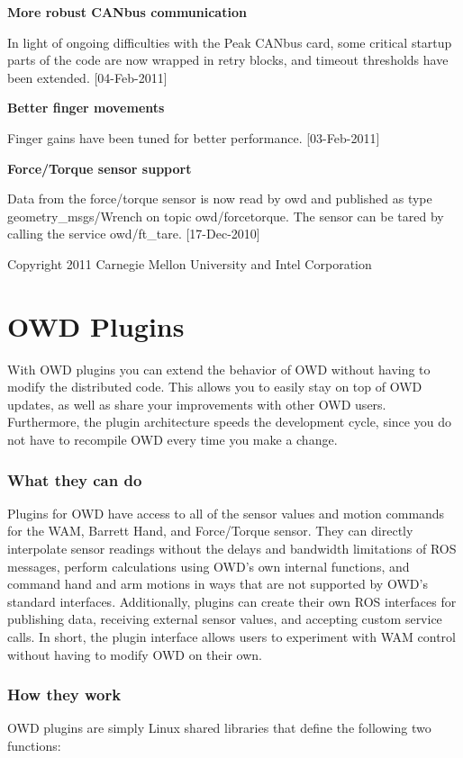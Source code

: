 {\bfseries More robust C\-A\-Nbus communication}\par
 In light of ongoing difficulties with the Peak C\-A\-Nbus card, some critical startup parts of the code are now wrapped in retry blocks, and timeout thresholds have been extended. \mbox{[}04-\/\-Feb-\/2011\mbox{]}

{\bfseries Better finger movements}\par
 Finger gains have been tuned for better performance. \mbox{[}03-\/\-Feb-\/2011\mbox{]}

{\bfseries Force/\-Torque sensor support}\par
 Data from the force/torque sensor is now read by owd and published as type geometry\-\_\-msgs/\-Wrench on topic owd/forcetorque. The sensor can be tared by calling the service owd/ft\-\_\-tare. \mbox{[}17-\/\-Dec-\/2010\mbox{]}

\begin{DoxyVerb}Copyright 2011 Carnegie Mellon University and Intel Corporation
\end{DoxyVerb}
 \hypertarget{plugins}{}\section{O\-W\-D Plugins}\label{plugins}
With O\-W\-D plugins you can extend the behavior of O\-W\-D without having to modify the distributed code. This allows you to easily stay on top of O\-W\-D updates, as well as share your improvements with other O\-W\-D users. Furthermore, the plugin architecture speeds the development cycle, since you do not have to recompile O\-W\-D every time you make a change.\hypertarget{plugins_plugin_what}{}\subsubsection{What they can do}\label{plugins_plugin_what}
Plugins for O\-W\-D have access to all of the sensor values and motion commands for the W\-A\-M, Barrett Hand, and Force/\-Torque sensor. They can directly interpolate sensor readings without the delays and bandwidth limitations of R\-O\-S messages, perform calculations using O\-W\-D's own internal functions, and command hand and arm motions in ways that are not supported by O\-W\-D's standard interfaces. Additionally, plugins can create their own R\-O\-S interfaces for publishing data, receiving external sensor values, and accepting custom service calls. In short, the plugin interface allows users to experiment with W\-A\-M control without having to modify O\-W\-D on their own.\hypertarget{plugins_plugin_how}{}\subsubsection{How they work}\label{plugins_plugin_how}
O\-W\-D plugins are simply Linux shared libraries that define the following two functions\-:

